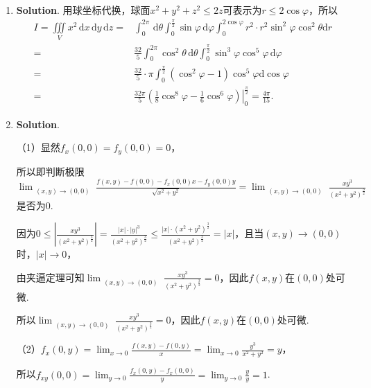 \documentclass[../Main.tex]{subfiles}
\begin{document}
\begin{enumerate}
    \item \textbf{Solution}. 用球坐标代换，球面$x^{2}+y^{2}+z^{2}\leq 2z$可表示为$r
              \leq 2\cos \varphi$，所以
          \[
              \begin{aligned}
                  I = \iiint\limits_{V}x^{2}\,\mathrm{d}x\,\mathrm{d}y\,\mathrm{d}z = & \int_{0}^{2\pi}\,\mathrm{d}\theta\int_{0}^{\frac{\pi}{2}}\sin\varphi\,\mathrm{d}\varphi\int_{0}^{2\cos \varphi}r^{2}\cdot r^{2}\sin^{2}\varphi\cos^{2}\theta \mathrm{d}r \\
                  =                                                                   & \frac{32}{5}\int_{0}^{2\pi}\cos^{2}\theta\,\mathrm{d}\theta\int_{0}^{\frac{\pi}{2}}\sin^{3}\varphi\cos^{5}\varphi\,\mathrm{d}\varphi                                     \\
                  =                                                                   & \frac{32}{5}\cdot \pi\int_{0}^{\frac{\pi}{2}}\left(\cos^{2} \varphi - 1\right)\cos^{5} \varphi \mathrm{d}\cos\varphi                                                     \\
                  =                                                                   & \frac{32\pi}{5}\left.\left(\frac{1}{8}\cos^{8} \varphi - \frac{1}{6}\cos^{6} \varphi\right)\right|_{0}^{\frac{\pi}{2}}= \frac{4\pi}{15}.
              \end{aligned}
          \]

    \item \textbf{Solution}.

          （1）显然$f_{x}(0,0) = f_{y}(0,0) = 0$，

          所以即判断极限$\lim_{\substack{(x,y)\to (0,0)}}\frac{f(x,y)-f(0,0)-f_{x}(0,0)x-f_{y}(0,0)y}{\sqrt{x^{2}+y^{2}}}
              = \lim_{\substack{(x,y)\to (0,0)}}\frac{xy^{3}}{(x^{2}+y^{2})^{\frac{3}{2}}}$是否为$0$.

          因为$0 \leq \left|\frac{xy^{3}}{(x^{2}+y^{2})^{\frac{3}{2}}}\right| = \frac{|x|\cdot|y|^{3}}{(x^{2}+y^{2})^{\frac{3}{2}}}
              \leq \frac{|x|\cdot (x^{2}+y^{2})^{\frac{3}{2}}}{(x^{2}+y^{2})^{\frac{3}{2}}}
              = |x|$，且当$(x,y)\to (0,0)$时，$|x|\to 0$，

          由夹逼定理可知$\lim_{\substack{(x,y)\to (0,0)}}\frac{xy^{3}}{(x^{2}+y^{2})^{\frac{3}{2}}}
              = 0$，因此$f(x,y)$在$(0,0)$处可微.

          所以$\lim_{\substack{(x,y)\to (0,0)}}\frac{xy^{3}}{(x^{2}+y^{2})^{\frac{3}{2}}}
              = 0$，因此$f(x,y)$在$(0,0)$处可微.

          （2）$f_{x}(0,y)=\lim_{x\to0}\frac{f(x,y)-f(0,y)}{x}= \lim_{x\to0}\frac{y^{3}}{x^{2}+y^{2}}
              = y$，

          所以$f_{xy}(0,0) = \lim_{y\to0}\frac{f_{x}(0,y)-f_{x}(0,0)}{y}= \lim_{y\to0}
              \frac{y}{y}= 1$.
\end{enumerate}
\end{document}
